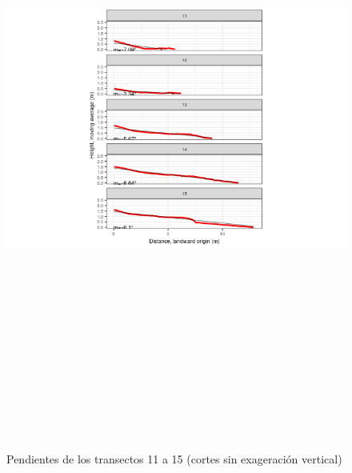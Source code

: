 \documentclass[11pt,]{article}
\begin{document}
\begin{figure}
\centering
\includegraphics[height=8.33333in]{panels-3.png}
\caption{Pendientes de los transectos 11 a 15 (cortes sin exageración
vertical) \label{transectos-perfil3}}
\end{figure}
\end{document}
